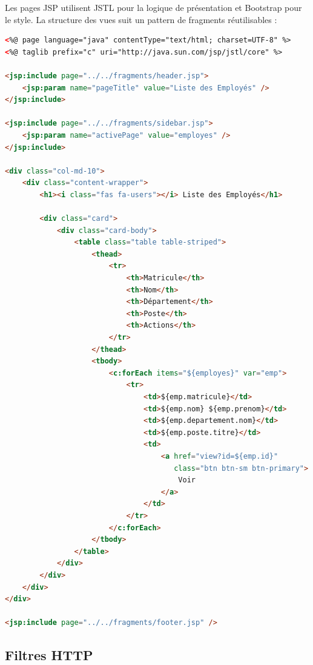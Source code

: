\documentclass[12pt,a4paper,twoside]{report}
\begin{document}
Les pages JSP utilisent JSTL pour la logique de présentation et Bootstrap pour le style. La structure des vues suit un pattern de fragments réutilisables :

\begin{lstlisting}[caption=Exemple de page JSP avec fragments, label=lst:jsp-example, language=HTML]
<%@ page language="java" contentType="text/html; charset=UTF-8" %>
<%@ taglib prefix="c" uri="http://java.sun.com/jsp/jstl/core" %>

<jsp:include page="../../fragments/header.jsp">
    <jsp:param name="pageTitle" value="Liste des Employés" />
</jsp:include>

<jsp:include page="../../fragments/sidebar.jsp">
    <jsp:param name="activePage" value="employes" />
</jsp:include>

<div class="col-md-10">
    <div class="content-wrapper">
        <h1><i class="fas fa-users"></i> Liste des Employés</h1>
        
        <div class="card">
            <div class="card-body">
                <table class="table table-striped">
                    <thead>
                        <tr>
                            <th>Matricule</th>
                            <th>Nom</th>
                            <th>Département</th>
                            <th>Poste</th>
                            <th>Actions</th>
                        </tr>
                    </thead>
                    <tbody>
                        <c:forEach items="${employes}" var="emp">
                            <tr>
                                <td>${emp.matricule}</td>
                                <td>${emp.nom} ${emp.prenom}</td>
                                <td>${emp.departement.nom}</td>
                                <td>${emp.poste.titre}</td>
                                <td>
                                    <a href="view?id=${emp.id}" 
                                       class="btn btn-sm btn-primary">
                                        Voir
                                    </a>
                                </td>
                            </tr>
                        </c:forEach>
                    </tbody>
                </table>
            </div>
        </div>
    </div>
</div>

<jsp:include page="../../fragments/footer.jsp" />
\end{lstlisting}

\subsection{Filtres HTTP}
\end{document}
